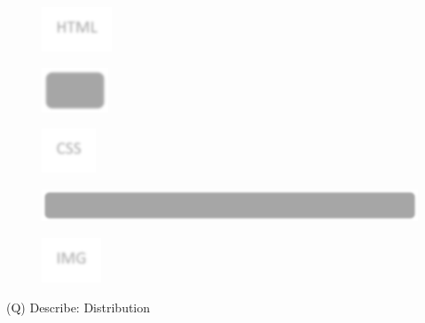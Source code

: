 \documentclass[12pt]{article}
\begin{document}
\begin{figure}[H]
\includegraphics[width=0.5\linewidth]{page78-image-11.png}
\end{figure}
\begin{figure}[H]
\includegraphics[width=0.5\linewidth]{page78-image-12.png}
\end{figure}
\begin{figure}[H]
\includegraphics[width=0.5\linewidth]{page78-image-13.png}
\end{figure}
\begin{figure}[H]
\includegraphics[width=0.5\linewidth]{page78-image-14.png}
\end{figure}
\begin{figure}[H]
\includegraphics[width=0.5\linewidth]{page78-image-15.png}
\end{figure}
\clearpage
(Q)
Describe: Distribution
\clearpage
\end{document}
